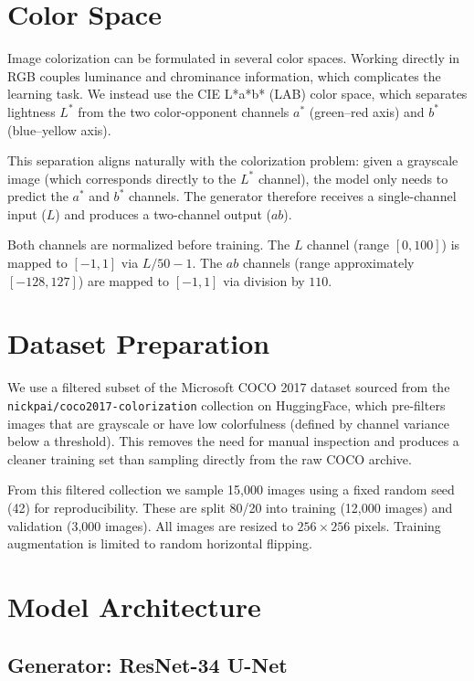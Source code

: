 \documentclass[12pt, a4paper, oneside]{report}
\begin{document}
\section{Color Space}

Image colorization can be formulated in several color spaces. Working directly in RGB
couples luminance and chrominance information, which complicates the learning task.
We instead use the CIE L*a*b* (LAB) color space, which separates lightness $L^*$
from the two color-opponent channels $a^*$ (green--red axis) and $b^*$ (blue--yellow
axis).

This separation aligns naturally with the colorization problem: given a grayscale
image (which corresponds directly to the $L^*$ channel), the model only needs to
predict the $a^*$ and $b^*$ channels. The generator therefore receives a
single-channel input ($L$) and produces a two-channel output ($ab$).

Both channels are normalized before training. The $L$ channel (range $[0, 100]$) is
mapped to $[-1, 1]$ via $L/50 - 1$. The $ab$ channels (range approximately
$[-128, 127]$) are mapped to $[-1, 1]$ via division by $110$.

\section{Dataset Preparation}

We use a filtered subset of the Microsoft COCO 2017 dataset \cite{lin2014microsoft}
sourced from the \texttt{nickpai/coco2017-colorization} collection on HuggingFace,
which pre-filters images that are grayscale or have low colorfulness (defined by
channel variance below a threshold). This removes the need for manual inspection
and produces a cleaner training set than sampling directly from the raw COCO
archive.

From this filtered collection we sample 15,000 images using a fixed random seed
(42) for reproducibility. These are split 80/20 into training (12,000 images) and
validation (3,000 images). All images are resized to $256 \times 256$ pixels.
Training augmentation is limited to random horizontal flipping.

\section{Model Architecture}

    \subsection{Generator: ResNet-34 U-Net}
\end{document}
